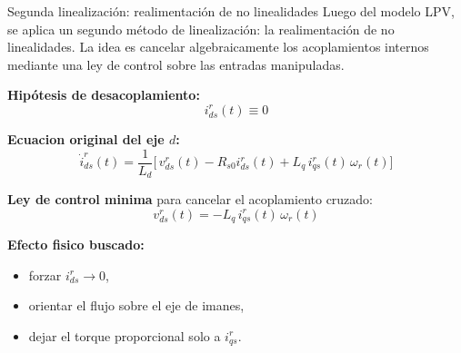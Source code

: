 \documentclass[aspectratio=169,t]{beamer}
\begin{document}
\begin{frame}{Segunda linealización: realimentación de no linealidades}
{\small\color{uncGray}Luego del modelo LPV, se aplica un segundo método de linealización: la realimentación de no linealidades. La idea es cancelar algebraicamente los acoplamientos internos mediante una ley de control sobre las entradas manipuladas.}\par
\vspace{3mm}

\textbf{Hipótesis de desacoplamiento:}
\begin{equation*}
i_{ds}^{r}(t)\equiv 0
\end{equation*}

\textbf{Ecuacion original del eje $d$:}
\begin{equation*}
\dot{i}_{ds}^{r}(t)=\frac{1}{L_d}\Big[\,v_{ds}^{r}(t)-R_{s0}i_{ds}^{r}(t)+L_q\,i_{qs}^{r}(t)\,\omega_r(t)\Big]
\end{equation*}

\textbf{Ley de control minima} para cancelar el acoplamiento cruzado:
\begin{equation*}
\boxed{\;v_{ds}^{r}(t)=-L_q\,i_{qs}^{r}(t)\,\omega_r(t)\;}
\end{equation*}

\textbf{Efecto fisico buscado:}
\begin{itemize}
  \item forzar $i_{ds}^{r}\to 0$,
  \item orientar el flujo sobre el eje de imanes,
  \item dejar el torque proporcional solo a $i_{qs}^{r}$.
\end{itemize}
\end{frame}
\end{document}
